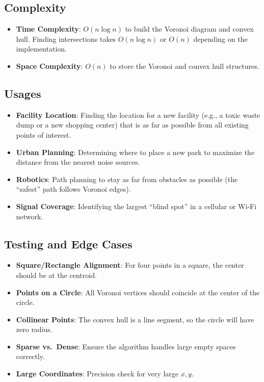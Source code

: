 \subsection{Complexity}

\begin{itemize}
\item \textbf{Time Complexity}: $O(n \log n)$ to build the Voronoi diagram and convex hull. Finding intersections takes $O(n \log n)$ or $O(n)$ depending on the implementation.
\item \textbf{Space Complexity}: $O(n)$ to store the Voronoi and convex hull structures.
\end{itemize}

\subsection{Usages}

\begin{itemize}
\item \textbf{Facility Location}: Finding the location for a new facility (e.g., a toxic waste dump or a new shopping center) that is as far as possible from all existing points of interest.
\item \textbf{Urban Planning}: Determining where to place a new park to maximize the distance from the nearest noise sources.
\item \textbf{Robotics}: Path planning to stay as far from obstacles as possible (the ``safest'' path follows Voronoi edges).
\item \textbf{Signal Coverage}: Identifying the largest ``blind spot'' in a cellular or Wi-Fi network.
\end{itemize}

\subsection{Testing and Edge Cases}

\begin{itemize}
\item \textbf{Square/Rectangle Alignment}: For four points in a square, the center should be at the centroid.
\item \textbf{Points on a Circle}: All Voronoi vertices should coincide at the center of the circle.
\item \textbf{Collinear Points}: The convex hull is a line segment, so the circle will have zero radius.
\item \textbf{Sparse vs.\ Dense}: Ensure the algorithm handles large empty spaces correctly.
\item \textbf{Large Coordinates}: Precision check for very large $x, y$.
\end{itemize}

